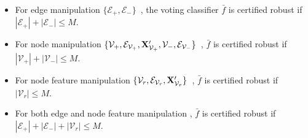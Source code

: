 \begin{itemize}[leftmargin=*]
    \vspace{-1mm}
    \item For edge manipulation $\{\mathcal{E}_+,\mathcal{E}_-\}$~\cite{bojchevski2020efficient,wang2021certified,xia2024gnncert}, the voting classifier $\bar{f}$ is certified robust if $|\mathcal{E}_+|+|\mathcal{E}_-|\leq M$.
        
    \vspace{-1mm}
    \item For node manipulation $\{\mathcal{V}_+, \mathcal{E}_{\mathcal{V}_+}, {\bf X}'_{\mathcal{V}_+},\mathcal{V}_-, \mathcal{E}_{\mathcal{V}_-}\}$~\cite{lai2023nodeawarebismoothingcertifiedrobustness}, 
    $\bar{f}$ is certified robust if $|{\mathcal{V}_+}|+|{\mathcal{V}_-}|\leq M$.

    \vspace{-1mm}
    \item For node feature manipulation $\{\mathcal{V}_r, \mathcal{E}_{\mathcal{V}_r},{\bf X}'_{\mathcal{V}_r}\}$~\cite{jin2020certified,xia2024gnncert}, 
$\bar{f}$ is certified robust if $|{\mathcal{V}_r}|\leq M$. 

    \vspace{-1mm}
    \item For both edge {and} node feature manipulation \cite{xia2024gnncert}, 
    $\bar{f}$ is certified robust if $|\mathcal{E}_+|+|\mathcal{E}_-| + |{\mathcal{V}_r}|\leq M$. 

\end{itemize}




